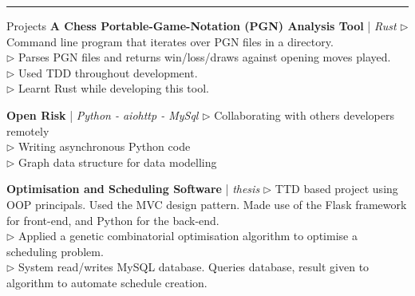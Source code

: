 \documentclass[12pt,twoside]{article}
\begin{document}
\vspace{1.2em}
\hrule
\vspace{1.2em}

\headedsection
    {Projects}
    {\textbf{A Chess Portable-Game-Notation (PGN) Analysis Tool} | \textit{Rust}}
    {
        $\triangleright$ Command line program that iterates over PGN files in a
        directory. \\
        $\triangleright$ Parses PGN files and returns win/loss/draws against
        opening moves played. \\
        $\triangleright$ Used TDD throughout development. \\
        $\triangleright$ Learnt Rust while developing this tool.
    }

\vspace{0.3em}

\headedsection
    {}
    {\textbf{Open Risk} | \textit{Python - aiohttp - MySql}}
    {
        $\triangleright$ Collaborating with others developers remotely \\
        $\triangleright$ Writing asynchronous Python code \\
        $\triangleright$ Graph data structure for data modelling
    }

\vspace{0.3em}

\headedsection
    {}
    {\textbf{Optimisation and Scheduling Software} | \textit{thesis}}
    {
        $\triangleright$ TTD based project using OOP principals. Used the MVC
        design pattern. Made use of the Flask framework for front-end, and
        Python for the back-end. \\
        $\triangleright$ Applied a genetic combinatorial optimisation algorithm
        to optimise a scheduling problem. \\
        $\triangleright$ System read/writes MySQL database. Queries database,
        result given to algorithm to automate schedule creation.
    }

\end{document}
